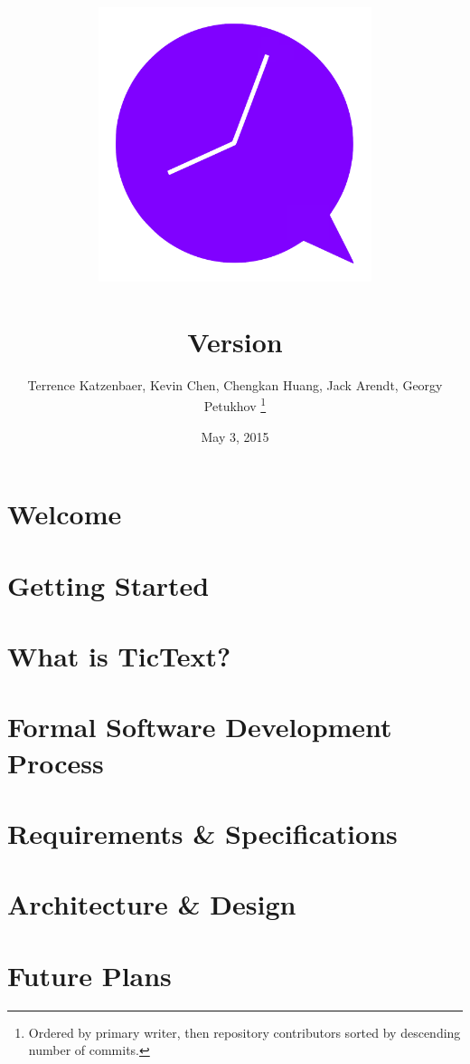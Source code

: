\documentclass[11pt, titlepage]{article} %
\title{
\includegraphics[width=8cm]{icon}\\
\kDocTitle\\
\large{Version \kDocVersion}
}
\author{
	Terrence Katzenbaer, Kevin Chen, Chengkan Huang, Jack Arendt, Georgy Petukhov
	\footnote{Ordered by primary writer, then repository contributors sorted by descending number of commits.}
}
\date{May 3, 2015} %
\begin{document}
\maketitle
\tableofcontents

\clearpage
\section{Welcome}


\section{Getting Started}


\clearpage
\section{What is TicText?}


\clearpage
\section{Formal Software Development Process}


\clearpage
\section{Requirements \& Specifications}


\clearpage
\section{Architecture \& Design}


\clearpage
\section{Future Plans}

\end{document}
